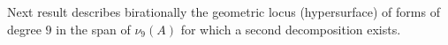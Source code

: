 \documentclass{amsart}
\newcommand{\Pj}{\mathbb{P}}
\theoremstyle{definition}
\begin{document}
%

Next result describes birationally the geometric locus
(hypersurface) of forms of degree $9$ in the span of $\nu_9(A)$ for which a second decomposition exists. 
\end{document}
